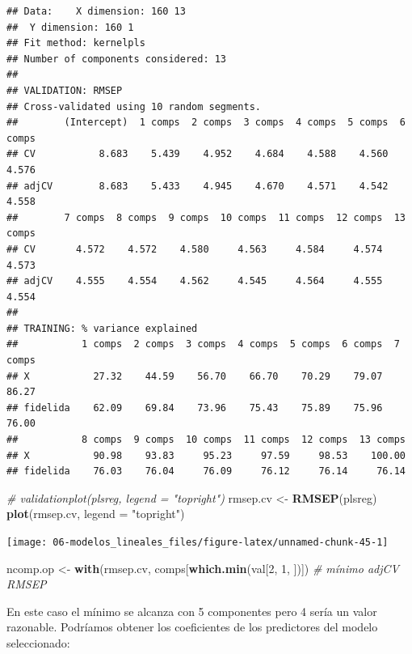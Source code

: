 \documentclass[
  spanish,
]{book}
\newenvironment{Shaded}{\begin{snugshade}}{\end{snugshade}}
\newcommand{\CommentTok}[1]{\textcolor[rgb]{0.56,0.35,0.01}{\textit{#1}}}
\newcommand{\DataTypeTok}[1]{\textcolor[rgb]{0.13,0.29,0.53}{#1}}
\newcommand{\DecValTok}[1]{\textcolor[rgb]{0.00,0.00,0.81}{#1}}
\newcommand{\KeywordTok}[1]{\textcolor[rgb]{0.13,0.29,0.53}{\textbf{#1}}}
\newcommand{\NormalTok}[1]{#1}
\newcommand{\StringTok}[1]{\textcolor[rgb]{0.31,0.60,0.02}{#1}}
\theoremstyle{break}
\theoremstyle{definition}
\theoremstyle{definition}
\theoremstyle{definition}
\theoremstyle{remark}
\begin{document}
\begin{verbatim}
## Data:    X dimension: 160 13 
##  Y dimension: 160 1
## Fit method: kernelpls
## Number of components considered: 13
## 
## VALIDATION: RMSEP
## Cross-validated using 10 random segments.
##        (Intercept)  1 comps  2 comps  3 comps  4 comps  5 comps  6 comps
## CV           8.683    5.439    4.952    4.684    4.588    4.560    4.576
## adjCV        8.683    5.433    4.945    4.670    4.571    4.542    4.558
##        7 comps  8 comps  9 comps  10 comps  11 comps  12 comps  13 comps
## CV       4.572    4.572    4.580     4.563     4.584     4.574     4.573
## adjCV    4.555    4.554    4.562     4.545     4.564     4.555     4.554
## 
## TRAINING: % variance explained
##           1 comps  2 comps  3 comps  4 comps  5 comps  6 comps  7 comps
## X           27.32    44.59    56.70    66.70    70.29    79.07    86.27
## fidelida    62.09    69.84    73.96    75.43    75.89    75.96    76.00
##           8 comps  9 comps  10 comps  11 comps  12 comps  13 comps
## X           90.98    93.83     95.23     97.59     98.53    100.00
## fidelida    76.03    76.04     76.09     76.12     76.14     76.14
\end{verbatim}

\begin{Shaded}
\begin{Highlighting}[]
\CommentTok{# validationplot(plsreg, legend = "topright")}
\NormalTok{rmsep.cv <-}\StringTok{ }\KeywordTok{RMSEP}\NormalTok{(plsreg)}
\KeywordTok{plot}\NormalTok{(rmsep.cv, }\DataTypeTok{legend =} \StringTok{"topright"}\NormalTok{)}
\end{Highlighting}
\end{Shaded}

\begin{center}\texttt{[image: 06-modelos\_lineales\_files/figure-latex/unnamed-chunk-45-1]} \end{center}

\begin{Shaded}
\begin{Highlighting}[]
\NormalTok{ncomp.op <-}\StringTok{ }\KeywordTok{with}\NormalTok{(rmsep.cv, comps[}\KeywordTok{which.min}\NormalTok{(val[}\DecValTok{2}\NormalTok{, }\DecValTok{1}\NormalTok{, ])]) }\CommentTok{# mínimo adjCV RMSEP}
\end{Highlighting}
\end{Shaded}

En este caso el mínimo se alcanza con 5 componentes pero 4 sería un valor razonable.
Podríamos obtener los coeficientes de los predictores del modelo seleccionado:
\end{document}
